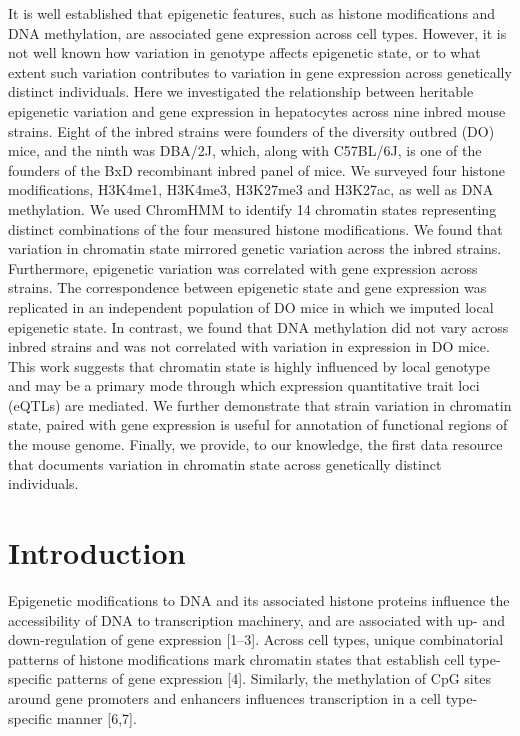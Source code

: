 \documentclass[10pt,letterpaper]{article}
\begin{document}
It is well established that epigenetic features, such as histone
modifications and DNA methylation, are associated gene expression across
cell types. However, it is not well known how variation in genotype
affects epigenetic state, or to what extent such variation contributes
to variation in gene expression across genetically distinct individuals.
Here we investigated the relationship between heritable epigenetic
variation and gene expression in hepatocytes across nine inbred mouse
strains. Eight of the inbred strains were founders of the diversity
outbred (DO) mice, and the ninth was DBA/2J, which, along with C57BL/6J,
is one of the founders of the BxD recombinant inbred panel of mice. We
surveyed four histone modifications, H3K4me1, H3K4me3, H3K27me3 and
H3K27ac, as well as DNA methylation. We used ChromHMM to identify 14
chromatin states representing distinct combinations of the four measured
histone modifications. We found that variation in chromatin state
mirrored genetic variation across the inbred strains. Furthermore,
epigenetic variation was correlated with gene expression across strains.
The correspondence between epigenetic state and gene expression was
replicated in an independent population of DO mice in which we imputed
local epigenetic state. In contrast, we found that DNA methylation did
not vary across inbred strains and was not correlated with variation in
expression in DO mice. This work suggests that chromatin state is highly
influenced by local genotype and may be a primary mode through which
expression quantitative trait loci (eQTLs) are mediated. We further
demonstrate that strain variation in chromatin state, paired with gene
expression is useful for annotation of functional regions of the mouse
genome. Finally, we provide, to our knowledge, the first data resource
that documents variation in chromatin state across genetically distinct
individuals.

\hypertarget{introduction}{%
\section{Introduction}\label{introduction}}

Epigenetic modifications to DNA and its associated histone proteins
influence the accessibility of DNA to transcription machinery, and are
associated with up- and down-regulation of gene expression {[}1--3{]}.
Across cell types, unique combinatorial patterns of histone
modifications mark chromatin states that establish cell type-specific
patterns of gene expression {[}4{]}. Similarly, the methylation of CpG
sites around gene promoters and enhancers influences transcription in a
cell type-specific manner {[}6,7{]}.
\end{document}

